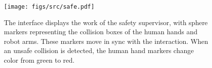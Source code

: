 
\begin{figure}[t]
    \centering
    \texttt{[image: figs/src/safe.pdf]}
    \caption{The interface displays the work of the safety supervisor, with sphere markers representing the collision boxes of the human hands and robot arms. These markers move in sync with the interaction. When an unsafe collision is detected, the human hand markers change color from green to red.}
    \label{fig:safe}
\end{figure}